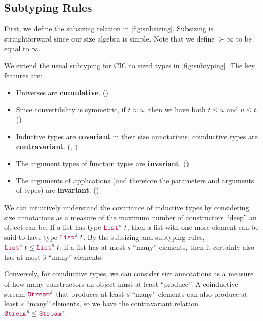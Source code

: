 \subsection{Subtyping Rules}\label{subsec:typing:subtyping}



First, we define the subsizing relation in \autoref{fig:subsizing}.
Subsizing is straightforward since our size algebra is simple.
Note that we define $\succ{\infty}$ to be equal to $\infty$.



We extend the usual subtyping for CIC to sized types in \autoref{fig:subtyping}.
The key features are:

\begin{itemize}
    \item Universes are \textbf{cumulative}. ()
    \item Since convertibility is symmetric, if $t \approx u$, then we have both $t \leq u$ and $u \leq t$. ()
    \item Inductive types are \textbf{covariant} in their size annotations; coinductive types are \textbf{contravariant}. (, )
    \item The argument types of function types are \textbf{invariant}. ()
    \item The arguments of applications (and therefore the parameters and arguments of \coinductive types) are \textbf{invariant}. ()
\end{itemize}

We can intuitively understand the covariance of inductive types by considering size annotations as a measure of the maximum number of constructors ``deep'' an object can be.
If a list has type $\List^s ~ t$, then a list with one more element can be said to have type $\List^{\hat{s}} ~ t$.
By the subsizing and subtyping rules, $\List^s ~ t \leq \List^{\hat{s}} ~ t$: if a list has at most $s$ ``many'' elements, then it certainly also has at most $\hat{s}$ ``many'' elements.

Conversely, for coinductive types, we can consider size annotations as a measure of how many constructors an object must at least ``produce''. A coinductive stream $\Stream^{\hat{s}}$ that produces at least $\hat{s}$ ``many'' elements can also produce at least $s$ ``many'' elements, so we have the contravariant relation $\Stream^{\hat{s}} \leq \Stream^s$.

